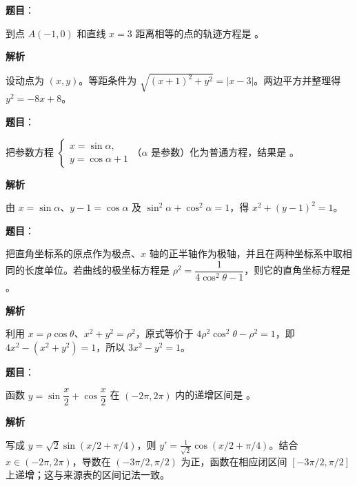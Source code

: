 \begin{answer}

\textbf{题目}：

到点 $A(-1,0)$ 和直线 $x=3$ 距离相等的点的轨迹方程是 \gkblank{}。

\textbf{解析}

设动点为 $(x,y)$。等距条件为 $\sqrt{(x+1)^2+y^2}=|x-3|$。两边平方并整理得 $y^2=-8x+8$。


\end{answer}
\begin{answer}

\textbf{题目}：

把参数方程 $\begin{cases}x=\sin\alpha,\\y=\cos\alpha+1\end{cases}$（$\alpha$ 是参数）化为普通方程，结果是 \gkblank{}。

\textbf{解析}

由 $x=\sin\alpha$、$y-1=\cos\alpha$ 及 $\sin^2\alpha+\cos^2\alpha=1$，得 $x^2+(y-1)^2=1$。


\end{answer}
\begin{answer}

\textbf{题目}：

把直角坐标系的原点作为极点、$x$ 轴的正半轴作为极轴，并且在两种坐标系中取相同的长度单位。若曲线的极坐标方程是 $\rho^2=\dfrac1{4\cos^2\theta-1}$，则它的直角坐标方程是 \gkblank{}。

\textbf{解析}

利用 $x=\rho\cos\theta$、$x^2+y^2=\rho^2$，原式等价于 $4\rho^2\cos^2\theta-\rho^2=1$，即 $4x^2-(x^2+y^2)=1$，所以 $3x^2-y^2=1$。


\end{answer}
\begin{answer}

\textbf{题目}：

函数 $y=\sin\dfrac x2+\cos\dfrac x2$ 在 $(-2\pi,2\pi)$ 内的递增区间是 \gkblank{}。

\textbf{解析}

写成 $y=\sqrt2\sin(x/2+\pi/4)$，则 $y'=\frac1{\sqrt2}\cos(x/2+\pi/4)$。结合 $x\in(-2\pi,2\pi)$，导数在 $(-3\pi/2,\pi/2)$ 为正，函数在相应闭区间 $[-3\pi/2,\pi/2]$ 上递增；这与来源表的区间记法一致。


\end{answer}
